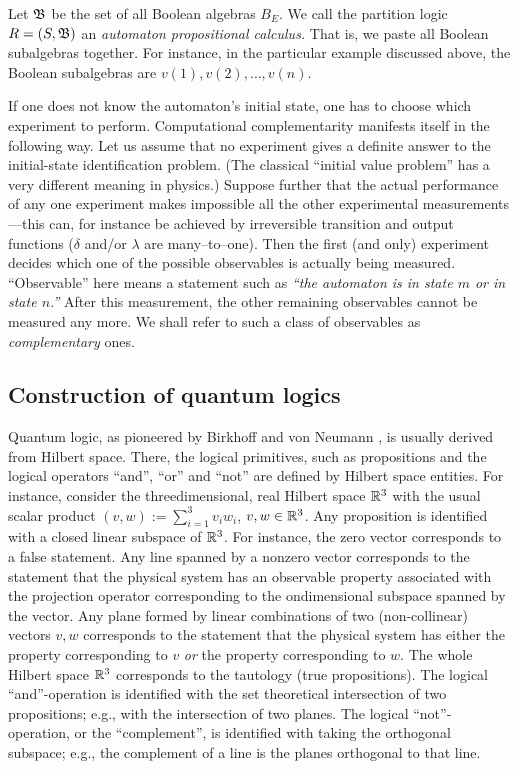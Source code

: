 Let ${\frak B}$ be the set of all Boolean algebras $B_E$.
We call the partition logic $R= (S,{\frak B})$ an {\em automaton
propositional calculus.} That is, we paste all Boolean subalgebras
together. For instance, in the particular example discussed above, the
Boolean subalgebras are $v(1),v(2),\ldots ,v(n)$.


If one does not know the automaton's initial state, one has to
choose which experiment to perform.
Computational complementarity manifests itself in the
following way.
Let us assume that no experiment gives a definite answer to the
initial-state identification problem.
(The classical ``initial value problem'' has a very different meaning in
physics.)
Suppose further that the actual performance of any one
experiment makes impossible all the other experimental
measurements---this can, for instance be achieved by irreversible
transition and output functions ($\delta$ and/or $\lambda$ are
many--to--one). Then the first (and only) experiment decides which one
of the possible observables is actually being measured.
``Observable'' here means a statement such as {\em ``the automaton is
in state $m$ or in state $n$.''}
 After
this measurement, the other remaining observables cannot be measured any
more.
We shall refer to such a class of observables as {\em complementary}
ones.

\subsection{Construction of quantum logics}

Quantum logic, as pioneered by Birkhoff and von Neumann
\cite{birkhoff-36}, is usually derived from Hilbert space. There, the
logical primitives, such as propositions and the logical operators ``and'',
``or'' and ``not'' are defined by Hilbert space entities. For instance,
consider the threedimensional, real Hilbert space ${\Bbb R}^3$ with the
usual
scalar product $(v,w):=\sum_{i=1}^3v_iw_i$, $v,w\in {\Bbb R}^3$.
Any
proposition is identified with a closed linear subspace of ${\Bbb R}^3$.
For instance, the zero
vector corresponds to a false statement. Any line spanned by a nonzero
vector corresponds to the statement that the physical system has an
observable property
associated with the projection operator corresponding to the
ondimensional subspace spanned by the vector. Any plane formed by
linear combinations
of two (non-collinear) vectors $v,w$ corresponds to the statement that
the
physical system has either the property corresponding to $v$ {\em or\/}
the property corresponding to
$w$. The whole Hilbert space ${\Bbb R}^3$ corresponds to the tautology
(true
propositions). The logical ``and''-operation is identified with the set
theoretical intersection of two propositions; e.g., with the intersection of
two planes. The logical ``not''-operation, or the ``complement'', is
identified with taking the orthogonal subspace; e.g., the complement of a
line is the planes orthogonal to that line.

